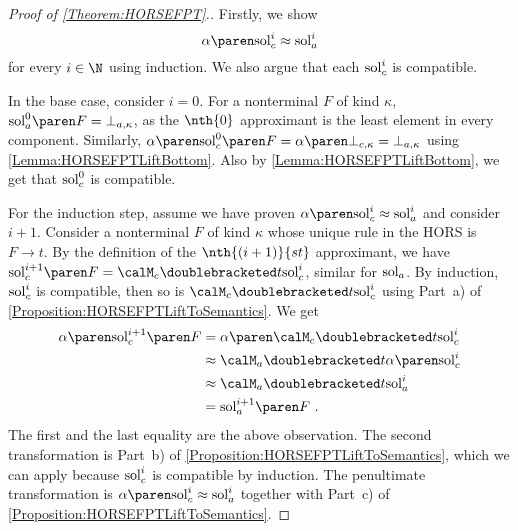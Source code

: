\documentclass[../../diss.tex]{subfiles}
\begin{document}
\begin{proof}[Proof of \cref{Theorem:HORSEFPT}.]
    Firstly, we show
    \[
        \abs{\solci{i}} \approx \solai{i}
    \]
    for every $i \in \N$ using induction.
    We also argue that each $\text{sol}_{c}^{i}$ is compatible.

    In the base case, consider $i = 0$.
    For a nonterminal $F$ of kind $\kappa$, $\sola{0}{F} = \bota{\kappa}$, as the $\nth{0}$ approximant is the least element in every component.
    Similarly, $\abs{\solc{0}{F}} = \abs{\botc{\kappa}} = \bota{\kappa}$ using \cref{Lemma:HORSEFPTLiftBottom}.
    Also by \cref{Lemma:HORSEFPTLiftBottom}, we get that $\text{sol}_{c}^{0}$ is compatible.

    For the induction step, assume we have proven $\abs{\solci{i}} \approx \solai{i}$ and consider $i+1$.
    Consider a nonterminal $F$ of kind $\kappa$ whose unique rule in the HORS is $F \to t$.
    By the definition of the $\nth{(i + 1)}{st}$ approximant, we have
    \( \solc{i+1}{F} = \semc{t}{\solci{i}} \), similar for $\sola$.
    By induction, $\text{sol}_{c}^{i}$ is compatible, then so is $\semc{t}{\solci{i}}$ using Part~a) of \cref{Proposition:HORSEFPTLiftToSemantics}.
    We get
    \begin{align*}
        \abs{\solc{i+1}{F}}
        &=
        \abs{\semc{t}{\solci{i}}}
        \\
        &\approx
        \sema{t}{\abs{\solci{i}}}
        \\
        &\approx
        \sema{t}{\solai{i}}
        \\
        &= \sola{i+1}{F}
        \ .
    \end{align*}
    The first and the last equality are the above observation.
    The second transformation is Part~b) of \cref{Proposition:HORSEFPTLiftToSemantics}, which we can apply because $\text{sol}_{c}^{i}$ is compatible by induction.
    The penultimate transformation is $\abs{\solci{i}} \approx \solai{i}$ together with Part~c) of \cref{Proposition:HORSEFPTLiftToSemantics}.


\end{proof}
\end{document}
